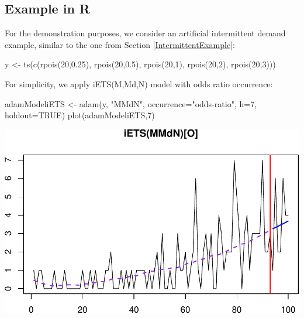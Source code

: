 \documentclass[
]{book}
\newenvironment{Shaded}{\begin{snugshade}}{\end{snugshade}}
\newcommand{\AttributeTok}[1]{\textcolor[rgb]{0.77,0.63,0.00}{#1}}
\newcommand{\ConstantTok}[1]{\textcolor[rgb]{0.00,0.00,0.00}{#1}}
\newcommand{\DecValTok}[1]{\textcolor[rgb]{0.00,0.00,0.81}{#1}}
\newcommand{\FloatTok}[1]{\textcolor[rgb]{0.00,0.00,0.81}{#1}}
\newcommand{\FunctionTok}[1]{\textcolor[rgb]{0.00,0.00,0.00}{#1}}
\newcommand{\NormalTok}[1]{#1}
\newcommand{\OtherTok}[1]{\textcolor[rgb]{0.56,0.35,0.01}{#1}}
\newcommand{\StringTok}[1]{\textcolor[rgb]{0.31,0.60,0.02}{#1}}
\theoremstyle{definition}
\theoremstyle{definition}
\theoremstyle{definition}
\theoremstyle{definition}
\theoremstyle{remark}
\begin{document}
\hypertarget{forecastingADAMOtherExample}{%
\subsection{Example in R}\label{forecastingADAMOtherExample}}

For the demonstration purposes, we consider an artificial intermittent demand example, similar to the one from Section \ref{IntermittentExample}:

\begin{Shaded}
\begin{Highlighting}[]
\NormalTok{y }\OtherTok{\textless{}{-}} \FunctionTok{ts}\NormalTok{(}\FunctionTok{c}\NormalTok{(}\FunctionTok{rpois}\NormalTok{(}\DecValTok{20}\NormalTok{,}\FloatTok{0.25}\NormalTok{), }\FunctionTok{rpois}\NormalTok{(}\DecValTok{20}\NormalTok{,}\FloatTok{0.5}\NormalTok{), }\FunctionTok{rpois}\NormalTok{(}\DecValTok{20}\NormalTok{,}\DecValTok{1}\NormalTok{),}
          \FunctionTok{rpois}\NormalTok{(}\DecValTok{20}\NormalTok{,}\DecValTok{2}\NormalTok{), }\FunctionTok{rpois}\NormalTok{(}\DecValTok{20}\NormalTok{,}\DecValTok{3}\NormalTok{)))}
\end{Highlighting}
\end{Shaded}

For simplicity, we apply iETS(M,Md,N) model with odds ratio occurrence:

\begin{Shaded}
\begin{Highlighting}[]
\NormalTok{adamModeliETS }\OtherTok{\textless{}{-}} \FunctionTok{adam}\NormalTok{(y, }\StringTok{"MMdN"}\NormalTok{, }\AttributeTok{occurrence=}\StringTok{"odds{-}ratio"}\NormalTok{,}
                      \AttributeTok{h=}\DecValTok{7}\NormalTok{, }\AttributeTok{holdout=}\ConstantTok{TRUE}\NormalTok{)}
\FunctionTok{plot}\NormalTok{(adamModeliETS,}\DecValTok{7}\NormalTok{)}
\end{Highlighting}
\end{Shaded}

\includegraphics{adam_files/figure-latex/unnamed-chunk-197-1.pdf}
\end{document}
